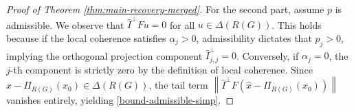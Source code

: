 \documentclass[a4paper,oneside]{amsart}
\begin{document}
\begin{proof}[Proof of Theorem \ref{thm:main-recovery-merged}]
    For the second part, assume $p$ is admissible. We observe that $\hat{I}^\perp F u = 0$ for all $u \in \Delta(R(G))$. This holds because if the local coherence satisfies $\alpha_j > 0$, admissibility dictates that $p_j > 0$, implying the orthogonal projection component $\hat{I}^\perp_{j,j} = 0$. Conversely, if $\alpha_j = 0$, the $j$-th component is strictly zero by the definition of local coherence. Since $\hat{x} - \Pi_{R(G)}(x_0) \in \Delta(R(G))$, the tail term $\left\|\hat{I}^\perp F(\hat{x} - \Pi_{R(G)}(x_0))\right\|$ vanishes entirely, yielding \eqref{bound-admissible-simp}.
\end{proof}



\end{document}
